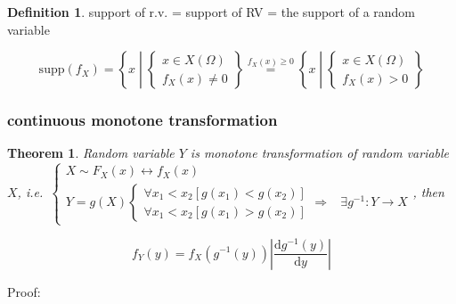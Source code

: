 \documentclass[
]{book}
\newtheorem{theorem}{Theorem}[chapter]
\theoremstyle{definition}
\newtheorem{definition}{Definition}[chapter]
\theoremstyle{definition}
\theoremstyle{definition}
\theoremstyle{definition}
\theoremstyle{remark}
\begin{document}
\begin{definition}
\protect\hypertarget{def:unnamed-chunk-14}{}\label{def:unnamed-chunk-14}support of r.v. = support of RV = the support of a random variable
\end{definition}

\[
\mathrm{supp}\left(f_{{\scriptscriptstyle X}}\right)=\left\{ x\middle|\begin{cases}
x\in X\left(\Omega\right)\\
f_{{\scriptscriptstyle X}}\left(x\right)\ne0
\end{cases}\right\} \overset{f_{{\scriptscriptstyle X}}\left(x\right)\ge0}{=}\left\{ x\middle|\begin{cases}
x\in X\left(\Omega\right)\\
f_{{\scriptscriptstyle X}}\left(x\right)>0
\end{cases}\right\} 
\]

\subsubsection{continuous monotone transformation}\label{continuous-monotone-transformation}

\begin{theorem}
\protect\hypertarget{thm:unnamed-chunk-15}{}\label{thm:unnamed-chunk-15}Random variable \(Y\) is monotone transformation of random variable \(X\), i.e.~\(\begin{cases}
X\sim F_{{\scriptscriptstyle X}}\left(x\right)\leftrightarrow f_{{\scriptscriptstyle X}}\left(x\right)\\
Y=g\left(X\right)\begin{cases}
\forall x_{{\scriptscriptstyle 1}}<x_{{\scriptscriptstyle 2}}\left[g\left(x_{{\scriptscriptstyle 1}}\right)<g\left(x_{{\scriptscriptstyle 2}}\right)\right]\\
\forall x_{{\scriptscriptstyle 1}}<x_{{\scriptscriptstyle 2}}\left[g\left(x_{{\scriptscriptstyle 1}}\right)>g\left(x_{{\scriptscriptstyle 2}}\right)\right]
\end{cases}\Rightarrow & \exists g^{-1}:Y\rightarrow X
\end{cases}\), then
\end{theorem}

\[
f_{{\scriptscriptstyle Y}}\left(y\right)=f_{{\scriptscriptstyle X}}\left(g^{-1}\left(y\right)\right)\left|\dfrac{\mathrm{d}g^{-1}\left(y\right)}{\mathrm{d}y}\right|
\]

Proof:
\end{document}
